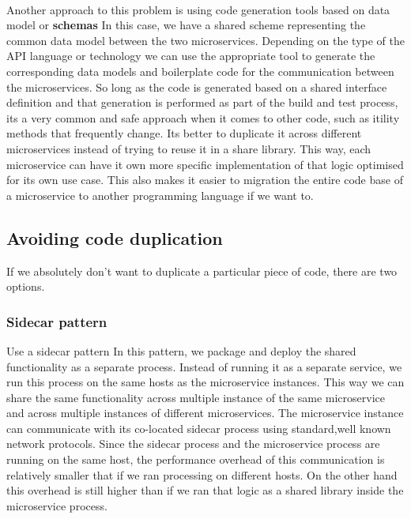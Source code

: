 \documentclass[a4paper, 11pt]{book}
\begin{document}
    \paragraph{}
    Another approach to this problem is using code generation tools based on data model or \textbf{schemas}
    In this case, we have a shared scheme representing the common data model between the two microservices.
    Depending on the type of the API language or technology we can use the appropriate tool to generate the corresponding data models and boilerplate code for the communication between the microservices.
    So long as the code is generated based on a shared interface definition and that generation is performed as part of the build and test process, its a very common and safe approach when it comes to other code, such as itility methods that frequently change.
    Its better to duplicate it across different microservices instead of trying to reuse it in a share library.
    This way, each microservice can have it own more specific implementation of that logic optimised for its own use case.
    This also makes it easier to migration the entire code base of a microservice to another programming language if we want to.

    \subsection{Avoiding code duplication}
    If we absolutely don't want to duplicate a particular piece of code, there are two options.

    \subsubsection{Sidecar pattern}
    Use a sidecar pattern
    In this pattern, we package and deploy the shared functionality as a separate process.
    Instead of running it as a separate service, we run this process on the same hosts as the microservice instances.
    This way we can share the same functionality across multiple instance of the same microservice and across multiple instances of different microservices.
    The microservice instance can communicate with its co-located sidecar process using standard,well known network protocols.
    Since the sidecar process and the microservice process are running on the same host, the performance overhead of this communication is relatively smaller that if we ran processing on different hosts.
    On the other hand this overhead is still higher than if we ran that logic as a shared library inside the microservice process.
\end{document}
